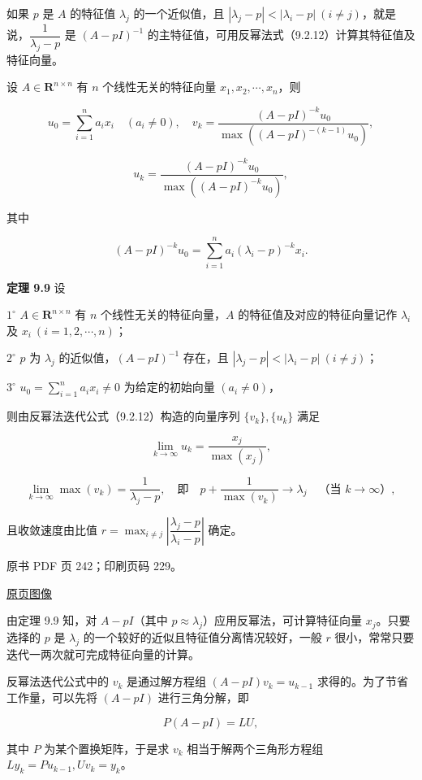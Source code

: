 如果 \(p\) 是 \(A\) 的特征值 \(\lambda_j\) 的一个近似值，且 \(|\lambda_j-p|<|\lambda_i-p|\ (i\ne j)\)，就是说，\(\dfrac1{\lambda_j-p}\) 是 \((A-pI)^{-1}\) 的主特征值，可用反幂法式（9.2.12）计算其特征值及特征向量。

设 \(A\in\mathbf R^{n\times n}\) 有 \(n\) 个线性无关的特征向量 \(x_1,x_2,\cdots,x_n\)，则

\[
u_0=\sum_{i=1}^na_ix_i\quad(a_i\ne0),\quad
v_k=\frac{(A-pI)^{-k}u_0}{\max((A-pI)^{-(k-1)}u_0)},
\]

\[
u_k=\frac{(A-pI)^{-k}u_0}{\max((A-pI)^{-k}u_0)},
\]

其中

\[
(A-pI)^{-k}u_0=\sum_{i=1}^na_i(\lambda_i-p)^{-k}x_i.
\]

\textbf{定理 9.9} 设

\(1^\circ\) \(A\in\mathbf R^{n\times n}\) 有 \(n\) 个线性无关的特征向量，\(A\) 的特征值及对应的特征向量记作 \(\lambda_i\) 及 \(x_i\ (i=1,2,\cdots,n)\)；

\(2^\circ\) \(p\) 为 \(\lambda_j\) 的近似值，\((A-pI)^{-1}\) 存在，且 \(|\lambda_j-p|<|\lambda_i-p|\ (i\ne j)\)；

\(3^\circ\) \(u_0=\displaystyle\sum_{i=1}^na_ix_i\ne0\) 为给定的初始向量 \((a_i\ne0)\)，

则由反幂法迭代公式（9.2.12）构造的向量序列 \(\{v_k\},\{u_k\}\) 满足

\[
\lim_{k\to\infty}u_k=\frac{x_j}{\max(x_j)},
\]

\[
\lim_{k\to\infty}\max(v_k)=\frac1{\lambda_j-p},\quad\text{即}\quad p+\frac1{\max(v_k)}\to\lambda_j\quad\text{（当 }k\to\infty\text{）},
\]

且收敛速度由比值 \(r=\displaystyle\max_{i\ne j}\left|\dfrac{\lambda_j-p}{\lambda_i-p}\right|\) 确定。

\clearpage

原书 PDF 页 242；印刷页码 229。

\href{source-images/pdf-242.jpeg}{原页图像}

由定理 9.9 知，对 \(A-pI\)（其中 \(p\approx\lambda_j\)）应用反幂法，可计算特征向量 \(x_j\)。只要选择的 \(p\) 是 \(\lambda_j\) 的一个较好的近似且特征值分离情况较好，一般 \(r\) 很小，常常只要迭代一两次就可完成特征向量的计算。

反幂法迭代公式中的 \(v_k\) 是通过解方程组 \((A-pI)v_k=u_{k-1}\) 求得的。为了节省工作量，可以先将 \((A-pI)\) 进行三角分解，即

\[
P(A-pI)=LU,
\]

其中 \(P\) 为某个置换矩阵，于是求 \(v_k\) 相当于解两个三角形方程组 \(Ly_k=Pu_{k-1},Uv_k=y_k\)。


